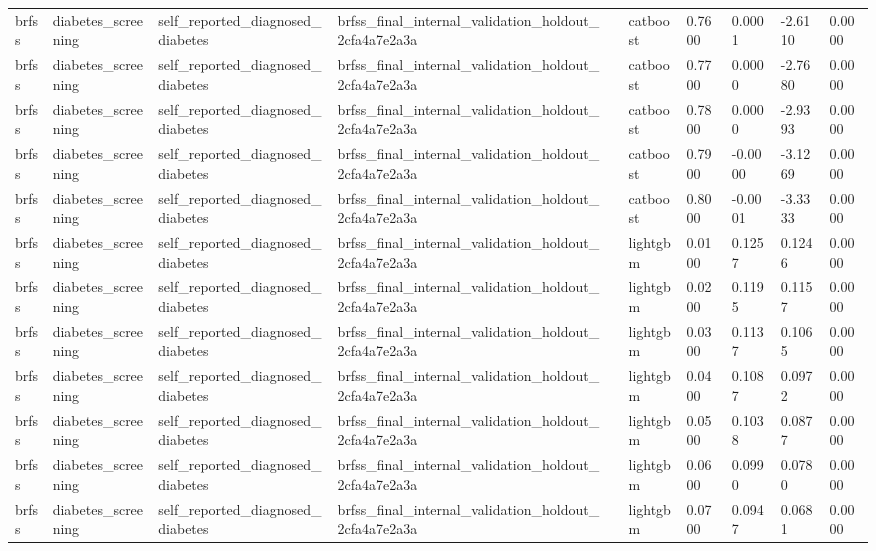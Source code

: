 \begin{tabular}{llllllllll}
brfss & diabetes\_screening & self\_reported\_diagnosed\_diabetes & brfss\_final\_internal\_validation\_holdout\_2cfa4a7e2a3a &  & catboost & 0.7600 & 0.0001 & -2.6110 & 0.0000 \\
brfss & diabetes\_screening & self\_reported\_diagnosed\_diabetes & brfss\_final\_internal\_validation\_holdout\_2cfa4a7e2a3a &  & catboost & 0.7700 & 0.0000 & -2.7680 & 0.0000 \\
brfss & diabetes\_screening & self\_reported\_diagnosed\_diabetes & brfss\_final\_internal\_validation\_holdout\_2cfa4a7e2a3a &  & catboost & 0.7800 & 0.0000 & -2.9393 & 0.0000 \\
brfss & diabetes\_screening & self\_reported\_diagnosed\_diabetes & brfss\_final\_internal\_validation\_holdout\_2cfa4a7e2a3a &  & catboost & 0.7900 & -0.0000 & -3.1269 & 0.0000 \\
brfss & diabetes\_screening & self\_reported\_diagnosed\_diabetes & brfss\_final\_internal\_validation\_holdout\_2cfa4a7e2a3a &  & catboost & 0.8000 & -0.0001 & -3.3333 & 0.0000 \\
brfss & diabetes\_screening & self\_reported\_diagnosed\_diabetes & brfss\_final\_internal\_validation\_holdout\_2cfa4a7e2a3a &  & lightgbm & 0.0100 & 0.1257 & 0.1246 & 0.0000 \\
brfss & diabetes\_screening & self\_reported\_diagnosed\_diabetes & brfss\_final\_internal\_validation\_holdout\_2cfa4a7e2a3a &  & lightgbm & 0.0200 & 0.1195 & 0.1157 & 0.0000 \\
brfss & diabetes\_screening & self\_reported\_diagnosed\_diabetes & brfss\_final\_internal\_validation\_holdout\_2cfa4a7e2a3a &  & lightgbm & 0.0300 & 0.1137 & 0.1065 & 0.0000 \\
brfss & diabetes\_screening & self\_reported\_diagnosed\_diabetes & brfss\_final\_internal\_validation\_holdout\_2cfa4a7e2a3a &  & lightgbm & 0.0400 & 0.1087 & 0.0972 & 0.0000 \\
brfss & diabetes\_screening & self\_reported\_diagnosed\_diabetes & brfss\_final\_internal\_validation\_holdout\_2cfa4a7e2a3a &  & lightgbm & 0.0500 & 0.1038 & 0.0877 & 0.0000 \\
brfss & diabetes\_screening & self\_reported\_diagnosed\_diabetes & brfss\_final\_internal\_validation\_holdout\_2cfa4a7e2a3a &  & lightgbm & 0.0600 & 0.0990 & 0.0780 & 0.0000 \\
brfss & diabetes\_screening & self\_reported\_diagnosed\_diabetes & brfss\_final\_internal\_validation\_holdout\_2cfa4a7e2a3a &  & lightgbm & 0.0700 & 0.0947 & 0.0681 & 0.0000 \\

\end{tabular}
